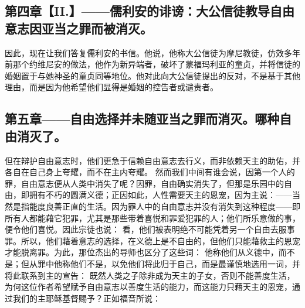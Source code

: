 
\subsection{第四章【II.】——儒利安的诽谤：大公信徒教导自由意志因亚当之罪而被消灭。}

因此，现在让我们答复儒利安的书信。他说，他称大公信徒为摩尼教徒，仿效多年前那个约维尼安的做法，他作为新异端者，破坏了蒙福玛利亚的童贞，并将信徒的婚姻置于与她神圣的童贞同等地位。他对此向大公信徒提出的反对，不是基于其他理由，而是因为他希望他们显得是婚姻的控告者或谴责者。\par


\subsection{第五章——自由选择并未随亚当之罪而消灭。哪种自由消灭了。}

但在辩护自由意志时，他们更急于信赖自由意志去行义，而非依赖天主的助佑，并各自在自己身上夸耀，而不在主内夸耀。 然而我们中间有谁会说，因第一个人的罪，自由意志便从人类中消失了呢？因罪，自由确实消失了，但那是乐园中的自由，即拥有不朽的圆满义德；正因如此，人性需要天主的恩宠，因为主说：——当然是指能度良善正直的生活。因为罪人中的自由意志并没有消失到这种程度——即所有人都能藉它犯罪，尤其是那些带着喜悦和罪爱犯罪的人；他们所乐意做的事，便令他们喜悦。因此宗徒也说： 看，他们被表明绝不可能凭着另一个自由去服事罪。所以，他们藉着意志的选择，在义德上是不自由的，但他们只能藉救主的恩宠才能脱离罪。为此，那位杰出的导师也区分了这些词： 他称他们从义德中，而不是；但从罪中他称他们不是，以免他们将此归于自己，而是最谨慎地选用一词，并将此联系到主的宣告： 既然人类之子除非成为天主的子女，否则不能善度生活，为何这位作者希望赋予自由意志以善度生活的能力，而这能力只藉天主的恩宠，通过我们的主耶稣基督赐予？正如福音所说：\par

